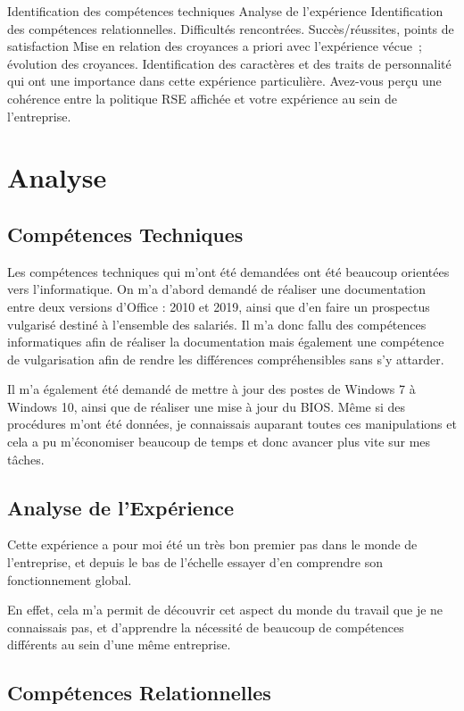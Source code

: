 


Identification des compétences techniques
Analyse de l’expérience 
Identification des compétences relationnelles.
Difficultés rencontrées.
Succès/réussites, points de satisfaction
Mise en relation des croyances a priori avec l’expérience vécue ; évolution des croyances.
Identification des caractères et des traits de personnalité qui ont une importance dans cette expérience particulière.
Avez-vous perçu une cohérence entre la politique RSE affichée et votre expérience au sein de l’entreprise. 

\section{Analyse}


\subsection{Compétences Techniques}

Les compétences techniques qui m'ont été demandées ont été beaucoup orientées vers l'informatique.
On m'a d'abord demandé de réaliser une documentation entre deux versions d'Office : 2010 et 2019, ainsi que d'en faire un prospectus vulgarisé destiné à l'ensemble des salariés.
Il m'a donc fallu des compétences informatiques afin de réaliser la documentation mais également une compétence de vulgarisation afin de rendre les différences compréhensibles sans s'y attarder.

Il m'a également été demandé de mettre à jour des postes de Windows 7 à Windows 10, ainsi que de réaliser une mise à jour du BIOS.
Même si des procédures m'ont été données, je connaissais auparant toutes ces manipulations et cela a pu m'économiser beaucoup de temps et donc avancer plus vite sur mes tâches.

\subsection{Analyse de l'Expérience}

Cette expérience a pour moi été un très bon premier pas dans le monde de l'entreprise, et depuis le bas de l'échelle essayer d'en comprendre son fonctionnement global.

En effet, cela m'a permit de découvrir cet aspect du monde du travail que je ne connaissais pas, et d'apprendre la nécessité de beaucoup de compétences différents au sein d'une même entreprise.


\subsection{Compétences Relationnelles}

